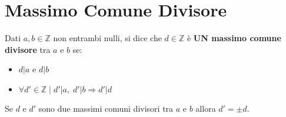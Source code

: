 \section{Massimo Comune Divisore}
Dati $a,b \in \mathbb{Z}$ non entrambi nulli, si dice che $d \in \mathbb{Z}$ è \textbf{UN massimo comune divisore} tra $a$ e $b$ se:
\begin{itemize}[nosep]
    \item $d|a$ e $d|b$
    \item $\forall d' \in \mathbb{Z} \; | \; d'|a, \; d'|b \Rightarrow d'|d$
\end{itemize}
Se $d$ e $d'$ sono due massimi comuni divisori tra $a$ e $b$ allora $d' = \pm d$.